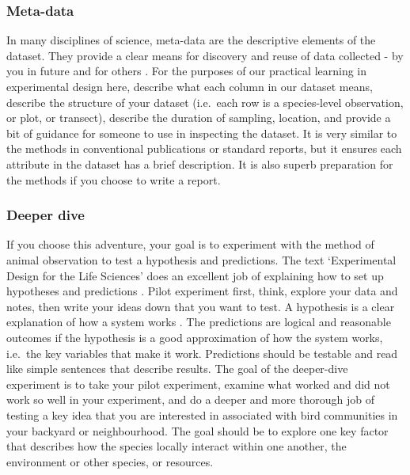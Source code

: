 \documentclass[
]{book}
\begin{document}
\hypertarget{meta-data}{%
\subsubsection*{Meta-data}\label{meta-data}}

In many disciplines of science, meta-data are the descriptive elements of the dataset. They provide a clear means for discovery and reuse of data collected - by you in future and for others \citep{RN3201, RN6774}. For the purposes of our practical learning in experimental design here, describe what each column in our dataset means, describe the structure of your dataset (i.e.~each row is a species-level observation, or plot, or transect), describe the duration of sampling, location, and provide a bit of guidance for someone to use in inspecting the dataset. It is very similar to the methods in conventional publications or standard reports, but it ensures each attribute in the dataset has a brief description. It is also superb preparation for the methods if you choose to write a report.

\hypertarget{deeper-dive}{%
\subsubsection*{Deeper dive}\label{deeper-dive}}

If you choose this adventure, your goal is to experiment with the method of animal observation to test a hypothesis and predictions. The text `Experimental Design for the Life Sciences' does an excellent job of explaining how to set up hypotheses and predictions \citep{RN6381}. Pilot experiment first, think, explore your data and notes, then write your ideas down that you want to test. A hypothesis is a clear explanation of how a system works \citep{RN6776, RN6775}. The predictions are logical and reasonable outcomes if the hypothesis is a good approximation of how the system works, i.e.~the key variables that make it work. Predictions should be testable and read like simple sentences that describe results. The goal of the deeper-dive experiment is to take your pilot experiment, examine what worked and did not work so well in your experiment, and do a deeper and more thorough job of testing a key idea that you are interested in associated with bird communities in your backyard or neighbourhood. The goal should be to explore one key factor that describes how the species locally interact within one another, the environment or other species, or resources.
\end{document}

